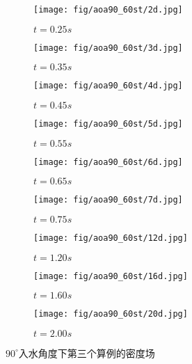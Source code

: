 \begin{figure}[!htp]
  \centering

  \begin{subfigure}{0.25\textwidth}
    \centering
    \texttt{[image: fig/aoa90\_60st/2d.jpg]}
    \caption{$t = 0.25s$}
  \end{subfigure}
  \hspace{1cm}
  \begin{subfigure}{0.25\textwidth}
    \centering
    \texttt{[image: fig/aoa90\_60st/3d.jpg]}
    \caption{$t = 0.35s$}
  \end{subfigure}
  \hspace{1cm}
  \begin{subfigure}{0.25\textwidth}
    \centering
    \texttt{[image: fig/aoa90\_60st/4d.jpg]}
    \caption{$t = 0.45s$}
  \end{subfigure}

  \quad

  \begin{subfigure}{0.25\textwidth}
    \centering
    \texttt{[image: fig/aoa90\_60st/5d.jpg]}
    \caption{$t = 0.55s$}
  \end{subfigure}
  \hspace{1cm}
  \begin{subfigure}{0.25\textwidth}
    \centering
    \texttt{[image: fig/aoa90\_60st/6d.jpg]}
    \caption{$t = 0.65s$}
  \end{subfigure}
  \hspace{1cm}
  \begin{subfigure}{0.25\textwidth}
    \centering
    \texttt{[image: fig/aoa90\_60st/7d.jpg]}
    \caption{$t = 0.75s$}
  \end{subfigure}

  \quad

  \begin{subfigure}{0.25\textwidth}
    \centering
    \texttt{[image: fig/aoa90\_60st/12d.jpg]}
    \caption{$t = 1.20s$}
  \end{subfigure}
  \hspace{1cm}
  \begin{subfigure}{0.25\textwidth}
    \centering
    \texttt{[image: fig/aoa90\_60st/16d.jpg]}
    \caption{$t = 1.60s$}
  \end{subfigure}
  \hspace{1cm}
  \begin{subfigure}{0.25\textwidth}
    \centering
    \texttt{[image: fig/aoa90\_60st/20d.jpg]}
    \caption{$t = 2.00s$}
  \end{subfigure}

  \caption{$90^\circ$入水角度下第三个算例的密度场}
  \label{fig:detail_90_d}
\end{figure}

